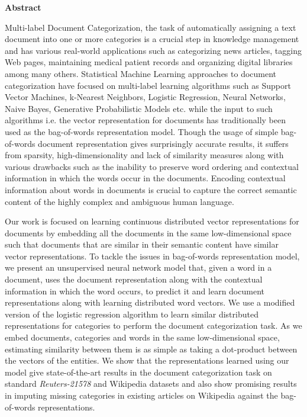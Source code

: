 \begin{center}
\huge{\textbf{Abstract}}
\end{center}

Multi-label Document Categorization, the task of automatically assigning a text document into one or more categories is a crucial step in knowledge management and has various real-world applications such as categorizing news articles, tagging Web pages, maintaining medical patient records and organizing digital libraries among many others. 
Statistical Machine Learning approaches to document categorization have focused on multi-label learning algorithms such as Support Vector Machines, k-Nearest Neighbors, Logistic Regression, Neural Networks, Naive Bayes, Generative Probabilistic Models etc. while the input to such algorithms i.e. the vector representation for documents has traditionally been used as the bag-of-words representation model. 
Though the usage of simple bag-of-words document representation gives surprisingly accurate results, it suffers from sparsity, high-dimensionality and lack of similarity measures along with various drawbacks such as the inability to preserve word ordering and contextual information in which the words occur in the documents. Encoding contextual information about words in documents is crucial to capture the correct semantic content of the highly complex and ambiguous human language.  \hfill \break

Our work is focused on learning continuous distributed vector representations for documents by embedding all the documents in the same low-dimensional space such that documents that are similar in their semantic content have similar vector representations. To tackle the issues in bag-of-words representation model, we present an unsupervised neural network model that, given a word in a document, uses the document representation along with the contextual information in which the word occurs, to predict it and learn document representations along with learning distributed word vectors. 
We use a modified version of the logistic regression algorithm to learn similar distributed representations for categories to perform the document categorization task. As we embed documents, categories and words in the same low-dimensional space, estimating similarity between them is as simple as taking a dot-product between the vectors of the entities. We show that the representations learned using our model give state-of-the-art results in the document categorization task on standard \emph{Reuters-21578} and Wikipedia datasets and also show promising results in imputing missing categories in existing articles on Wikipedia against the bag-of-words representations.